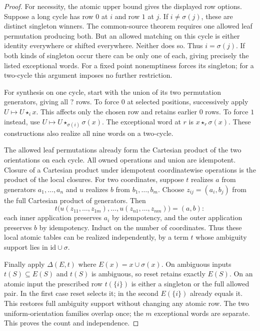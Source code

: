 \documentclass[11pt]{article}
\begin{document}
\begin{proof}
For necessity, the atomic upper bound gives the displayed row options.
Suppose a long cycle has row $0$ at $i$ and row $1$ at $j$. If
$i\ne\sigma(j)$, these are distinct singleton winners. The common-source
theorem requires one allowed leaf permutation producing both. But an
allowed matching on this cycle is either identity everywhere or shifted
everywhere. Neither does so. Thus $i=\sigma(j)$. If both kinds of
singleton occur there can be only one of each, giving precisely the
listed exceptional words. For a fixed point nonemptiness forces its
singleton; for a two-cycle this argument imposes no further restriction.

For synthesis on one cycle, start with the union of its two permutation
generators, giving all $?$ rows. To force $0$ at selected positions,
successively apply $U\mapsto U\star_i x$. This affects only the chosen
row and retains earlier $0$ rows. To force $1$ instead, use
$U\mapsto U\star_{\sigma(i)}\sigma(x)$. The exceptional word at $r$ is
$x\star_r\sigma(x)$. These constructions also realize all nine words
on a two-cycle.

The allowed leaf permutations already form the Cartesian product of
the two orientations on each cycle. All owned operations and union are
idempotent. Closure of a Cartesian product under idempotent
coordinatewise operations is the product of the local closures.
For two coordinates, suppose $t$ realizes $a$ from generators
$a_1,\ldots,a_n$ and $u$ realizes $b$ from $b_1,\ldots,b_m$.
Choose $z_{ij}=(a_i,b_j)$ from the full Cartesian product of generators.
Then
\[
 t\bigl(u(z_{11},\ldots,z_{1m}),\ldots,
         u(z_{n1},\ldots,z_{nm})\bigr)=(a,b):
\]
each inner application preserves $a_i$ by idempotency, and the outer
application preserves $b$ by idempotency. Induct on the number of
coordinates. Thus these local atomic tables
can be realized independently, by a term $t$ whose ambiguity support
lies in $\mathrm{id}\cup\sigma$.

Finally apply $\Delta(E,t)$ where $E(x)=x\cup\sigma(x)$.
On ambiguous inputs $t(S)\subseteq E(S)$ and $t(S)$ is ambiguous, so
reset retains exactly $E(S)$. On an atomic input the prescribed row
$t(\{i\})$ is either a singleton or the full allowed pair. In the first
case reset selects it; in the second $E(\{i\})$ already equals it.
This restores full ambiguity support without changing any atomic row.
The two uniform-orientation families overlap once; the $m$ exceptional
words are separate. This proves the count and independence.
\end{proof}
\end{document}
